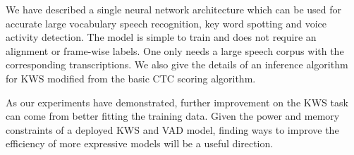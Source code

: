 We have described a single neural network architecture which can be used for
accurate large vocabulary speech recognition, key word spotting and voice
activity detection. The model is simple to train and does not require an
alignment or frame-wise labels. One only needs a large speech corpus with the
corresponding transcriptions. We also give the details of an inference
algorithm for KWS modified from the basic CTC scoring algorithm.

As our experiments have demonstrated, further improvement on the KWS task can
come from better fitting the training data. Given the power and memory
constraints of a deployed KWS and VAD model, finding ways to improve the
efficiency of more expressive models will be a useful direction.
